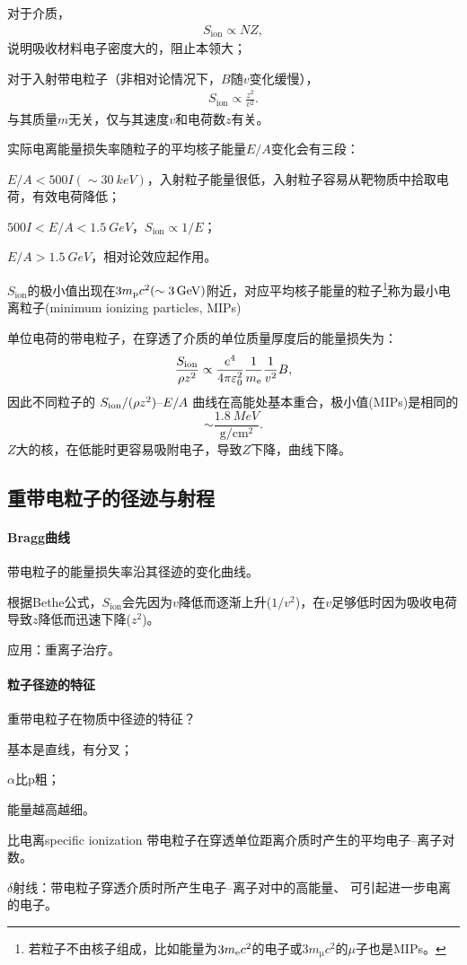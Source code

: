 对于介质，
\begin{align}
	S_{\mathrm{ion}} \propto NZ,
\end{align}
说明吸收材料电子密度大的，阻止本领大；

对于入射带电粒子（非相对论情况下，$B$随$v$变化缓慢），
\begin{align}
	S_{\mathrm{ion}} \propto \frac{z^2}{v^2}.
\end{align}
与其质量$m$无关，仅与其速度$v$和电荷数$z$有关。

实际电离能量损失率随粒子的平均核子能量$E/A$变化会有三段：
\begin{compactenum}
	\item $E/A < 500I(\sim \qty{30}{keV})$，入射粒子能量很低，入射粒子容易从靶物质中拾取电荷，有效电荷降低；
	\item $500I < E/A < \qty{1.5}{GeV}$，$S_{\mathrm{ion}} \propto 1/E$；
	\item $E/A > \qty{1.5}{GeV}$，相对论效应起作用。
\end{compactenum}
$S_{\mathrm{ion}}$的极小值出现在$3m_\proton c^2(\sim \qty{3}{GeV})$附近，对应平均核子能量的粒子\footnote{若粒子不由核子组成，比如能量为$3m_\electron c^2$的电子或$3m_\upmu c^2$的$\mu$子也是MIPs。}称为最小电离粒子(minimum ionizing particles, MIPs)

单位电荷的带电粒子，在穿透了介质的单位质量厚度后的能量损失为：
\[
	\frac{S_{\mathrm{ion}}}{\rho z^2} \propto \frac{e^4}{4\pi\varepsilon_0^2}\frac{1}{m_\electron}\frac{1}{v^2}B,
\]
因此不同粒子的 $S_{\mathrm{ion}}/(\rho z^2)\vs E/A$ 曲线在高能处基本重合，极小值(MIPs)是相同的
\[
	\sim \frac{\qty{1.8}{MeV}}{\unit{\gram\per\centi\metre\squared}}.
\]
$Z$大的核，在低能时更容易吸附电子，导致$Z$下降，曲线下降。

\subsection{重带电粒子的径迹与射程}

\paragraph{Bragg曲线}带电粒子的能量损失率沿其径迹的变化曲线。

根据Bethe公式，$S_{\mathrm{ion}}$会先因为$v$降低而逐渐上升($1/v^2$)，在$v$足够低时因为吸收电荷导致$z$降低而迅速下降($z^2$)。

应用：重离子治疗。
\paragraph{粒子径迹的特征}重带电粒子在物质中径迹的特征？
\begin{compactenum}
	\item 基本是直线，有分叉；
	\item $\alpha$比p粗；
	\item 能量越高越细。
\end{compactenum}
\begin{definition}{比电离}{specific ionization}
	带电粒子在穿透单位距离介质时产生的平均电子--离子对数。
\end{definition}
$\delta$射线：带电粒子穿透介质时所产生电子--离子对中的高能量、 可引起进一步电离的电子。
